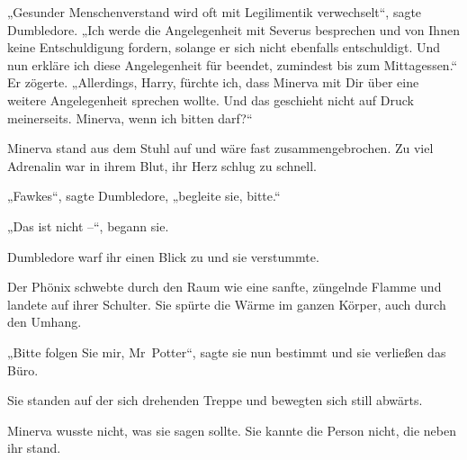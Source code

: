 „Gesunder Menschenverstand wird oft mit Legilimentik verwechselt“, sagte Dumbledore. „Ich werde die Angelegenheit mit Severus besprechen und von Ihnen keine Entschuldigung fordern, solange er sich nicht ebenfalls entschuldigt. Und nun erkläre ich diese Angelegenheit für beendet, zumindest bis zum Mittagessen.“ Er zögerte. „Allerdings, Harry, fürchte ich, dass Minerva mit Dir über eine weitere Angelegenheit sprechen wollte. Und das geschieht nicht auf Druck meinerseits. Minerva, wenn ich bitten darf?“ 

Minerva stand aus dem Stuhl auf und wäre fast zusammengebrochen. Zu viel Adrenalin war in ihrem Blut, ihr Herz schlug zu schnell. 

„Fawkes“, sagte Dumbledore, „begleite sie, bitte.“ 

„Das ist nicht –“, begann sie. 

Dumbledore warf ihr einen Blick zu und sie verstummte. 

Der Phönix schwebte durch den Raum wie eine sanfte, züngelnde Flamme und landete auf ihrer Schulter. Sie spürte die Wärme im ganzen Körper, auch durch den Umhang. 

„Bitte folgen Sie mir, Mr~Potter“, sagte sie nun bestimmt und sie verließen das Büro. 

\later 

Sie standen auf der sich drehenden Treppe und bewegten sich still abwärts. 

Minerva wusste nicht, was sie sagen sollte. Sie kannte die Person nicht, die neben ihr stand. 

